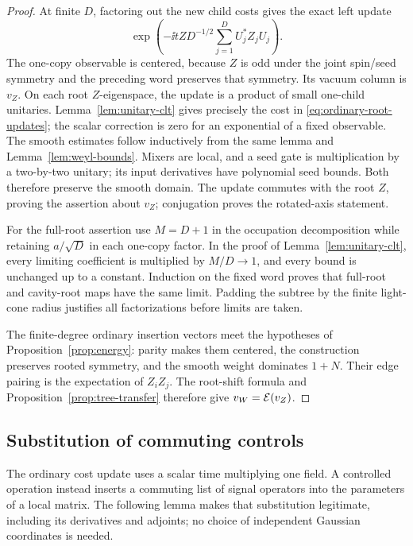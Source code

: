 \begin{proof}
At finite $D$, factoring out the new child costs gives the exact
left update
\[
 \exp\left(-\ii tZ D^{-1/2}\sum_{j=1}^D
                            U_j^*Z_jU_j\right).
\]
The one-copy observable is centered, because $Z$ is odd under
the joint spin/seed symmetry and the preceding word preserves
that symmetry.  Its vacuum column is $v_Z$.  On each root
$Z$-eigenspace, the update is a product of small one-child
unitaries.  Lemma~\ref{lem:unitary-clt} gives precisely the
cost in \eqref{eq:ordinary-root-updates}; the scalar correction
is zero for an exponential of a fixed observable.  The smooth
estimates follow inductively from the same lemma and
Lemma~\ref{lem:weyl-bounds}.  Mixers are local, and a seed
gate is multiplication by a two-by-two unitary; its input
derivatives have polynomial seed bounds.  Both therefore
preserve the smooth domain.  The update commutes with the
root $Z$, proving the assertion about $v_Z$; conjugation proves
the rotated-axis statement.

For the full-root assertion use $M=D+1$ in the occupation
decomposition while retaining $a/\sqrt D$ in each one-copy
factor.  In the proof of Lemma~\ref{lem:unitary-clt}, every
limiting coefficient is multiplied by $M/D\to1$, and every
bound is unchanged up to a constant.  Induction on the fixed
word proves that full-root and cavity-root maps have the same
limit. Padding the subtree by the finite light-cone radius
justifies all factorizations before limits are taken.

The finite-degree ordinary insertion vectors meet the hypotheses of
Proposition~\ref{prop:energy}: parity makes them centered, the
construction preserves rooted symmetry, and the smooth weight
dominates $1+N$. Their edge pairing is the expectation of $Z_iZ_j$.
The root-shift formula and Proposition~\ref{prop:tree-transfer}
therefore give $v_W=\mathcal E(v_Z)$.
\end{proof}

\subsection{Substitution of commuting controls}
\label{sec:commuting-controls}

The ordinary cost update uses a scalar time multiplying one field.
A controlled operation instead inserts a commuting list of signal
operators into the parameters of a local matrix. The following lemma
makes that substitution legitimate,
including its derivatives and adjoints; no choice of independent
Gaussian coordinates is needed.

